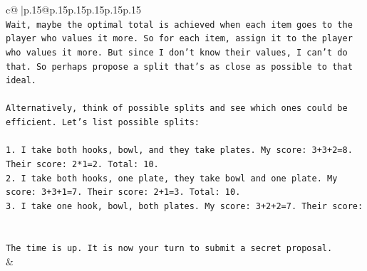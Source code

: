 \documentclass{article}
\begin{document}
{\begin{supertabular}{c@{$\;$}|p{.15\linewidth}@{}p{.15\linewidth}p{.15\linewidth}p{.15\linewidth}p{.15\linewidth}p{.15\linewidth}}
{{{\\ 
\texttt{Wait, maybe the optimal total is achieved when each item goes to the player who values it more. So for each item, assign it to the player who values it more. But since I don't know their values, I can't do that. So perhaps propose a split that's as close as possible to that ideal.} \\
\\ 
\texttt{Alternatively, think of possible splits and see which ones could be efficient. Let's list possible splits:} \\
\\ 
\texttt{1. I take both hooks, bowl, and they take plates. My score: 3+3+2=8. Their score: 2*1=2. Total: 10.} \\
\texttt{2. I take both hooks, one plate, they take bowl and one plate. My score: 3+3+1=7. Their score: 2+1=3. Total: 10.} \\
\texttt{3. I take one hook, bowl, both plates. My score: 3+2+2=7. Their score:} \\
\\ 
\\ 
\texttt{The time is up. It is now your turn to submit a secret proposal.} \\
            }
        }
    }
    & \\ \\


\end{supertabular}}
\end{document}
